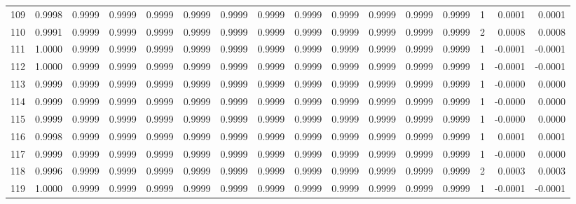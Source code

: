 \begin{tabular}{lrrrrrrrrrrrrrrr}
109 &      0.9998 &  0.9999 &  0.9999 &  0.9999 &  0.9999 &  0.9999 &  0.9999 &  0.9999 &  0.9999 &  0.9999 &   0.9999 &     0.9999 &      1 &                    0.0001 &                     0.0001 \\
110 &      0.9991 &  0.9999 &  0.9999 &  0.9999 &  0.9999 &  0.9999 &  0.9999 &  0.9999 &  0.9999 &  0.9999 &   0.9999 &     0.9999 &      2 &                    0.0008 &                     0.0008 \\
111 &      1.0000 &  0.9999 &  0.9999 &  0.9999 &  0.9999 &  0.9999 &  0.9999 &  0.9999 &  0.9999 &  0.9999 &   0.9999 &     0.9999 &      1 &                   -0.0001 &                    -0.0001 \\
112 &      1.0000 &  0.9999 &  0.9999 &  0.9999 &  0.9999 &  0.9999 &  0.9999 &  0.9999 &  0.9999 &  0.9999 &   0.9999 &     0.9999 &      1 &                   -0.0001 &                    -0.0001 \\
113 &      0.9999 &  0.9999 &  0.9999 &  0.9999 &  0.9999 &  0.9999 &  0.9999 &  0.9999 &  0.9999 &  0.9999 &   0.9999 &     0.9999 &      1 &                   -0.0000 &                     0.0000 \\
114 &      0.9999 &  0.9999 &  0.9999 &  0.9999 &  0.9999 &  0.9999 &  0.9999 &  0.9999 &  0.9999 &  0.9999 &   0.9999 &     0.9999 &      1 &                   -0.0000 &                     0.0000 \\
115 &      0.9999 &  0.9999 &  0.9999 &  0.9999 &  0.9999 &  0.9999 &  0.9999 &  0.9999 &  0.9999 &  0.9999 &   0.9999 &     0.9999 &      1 &                   -0.0000 &                     0.0000 \\
116 &      0.9998 &  0.9999 &  0.9999 &  0.9999 &  0.9999 &  0.9999 &  0.9999 &  0.9999 &  0.9999 &  0.9999 &   0.9999 &     0.9999 &      1 &                    0.0001 &                     0.0001 \\
117 &      0.9999 &  0.9999 &  0.9999 &  0.9999 &  0.9999 &  0.9999 &  0.9999 &  0.9999 &  0.9999 &  0.9999 &   0.9999 &     0.9999 &      1 &                   -0.0000 &                     0.0000 \\
118 &      0.9996 &  0.9999 &  0.9999 &  0.9999 &  0.9999 &  0.9999 &  0.9999 &  0.9999 &  0.9999 &  0.9999 &   0.9999 &     0.9999 &      2 &                    0.0003 &                     0.0003 \\
119 &      1.0000 &  0.9999 &  0.9999 &  0.9999 &  0.9999 &  0.9999 &  0.9999 &  0.9999 &  0.9999 &  0.9999 &   0.9999 &     0.9999 &      1 &                   -0.0001 &                    -0.0001 \\

\end{tabular}

